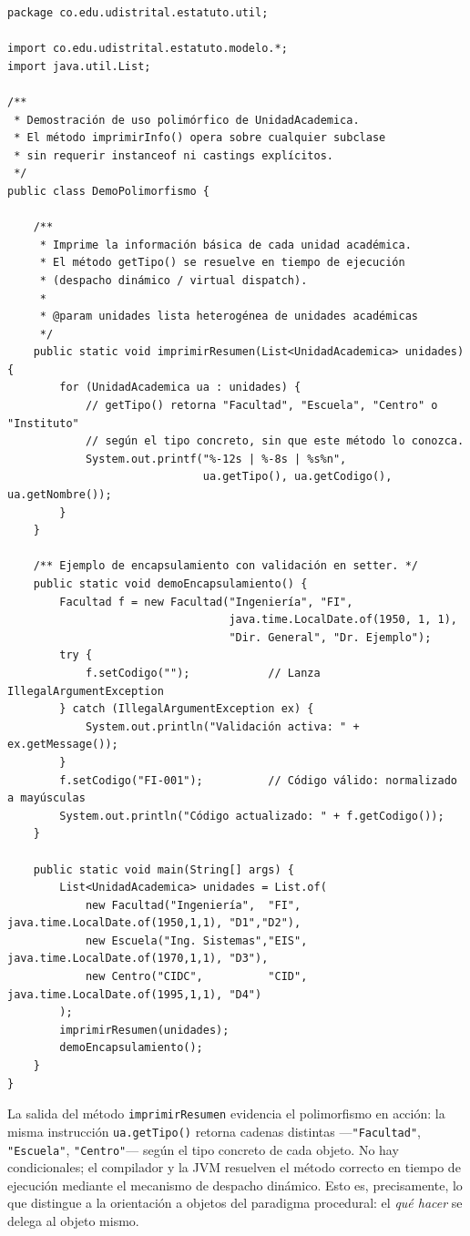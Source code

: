 \begin{lstlisting}[style=javaStyle, caption={Ejemplo de polimorfismo con \texttt{UnidadAcademica}}, label={lst:polimorfismo}]
package co.edu.udistrital.estatuto.util;

import co.edu.udistrital.estatuto.modelo.*;
import java.util.List;

/**
 * Demostración de uso polimórfico de UnidadAcademica.
 * El método imprimirInfo() opera sobre cualquier subclase
 * sin requerir instanceof ni castings explícitos.
 */
public class DemoPolimorfismo {

    /**
     * Imprime la información básica de cada unidad académica.
     * El método getTipo() se resuelve en tiempo de ejecución
     * (despacho dinámico / virtual dispatch).
     *
     * @param unidades lista heterogénea de unidades académicas
     */
    public static void imprimirResumen(List<UnidadAcademica> unidades) {
        for (UnidadAcademica ua : unidades) {
            // getTipo() retorna "Facultad", "Escuela", "Centro" o "Instituto"
            // según el tipo concreto, sin que este método lo conozca.
            System.out.printf("%-12s | %-8s | %s%n",
                              ua.getTipo(), ua.getCodigo(), ua.getNombre());
        }
    }

    /** Ejemplo de encapsulamiento con validación en setter. */
    public static void demoEncapsulamiento() {
        Facultad f = new Facultad("Ingeniería", "FI",
                                  java.time.LocalDate.of(1950, 1, 1),
                                  "Dir. General", "Dr. Ejemplo");
        try {
            f.setCodigo("");            // Lanza IllegalArgumentException
        } catch (IllegalArgumentException ex) {
            System.out.println("Validación activa: " + ex.getMessage());
        }
        f.setCodigo("FI-001");          // Código válido: normalizado a mayúsculas
        System.out.println("Código actualizado: " + f.getCodigo());
    }

    public static void main(String[] args) {
        List<UnidadAcademica> unidades = List.of(
            new Facultad("Ingeniería",  "FI",  java.time.LocalDate.of(1950,1,1), "D1","D2"),
            new Escuela("Ing. Sistemas","EIS", java.time.LocalDate.of(1970,1,1), "D3"),
            new Centro("CIDC",          "CID", java.time.LocalDate.of(1995,1,1), "D4")
        );
        imprimirResumen(unidades);
        demoEncapsulamiento();
    }
}
\end{lstlisting}

\noindent
La salida del método \texttt{imprimirResumen} evidencia el polimorfismo en acción:
la misma instrucción \texttt{ua.getTipo()} retorna cadenas distintas
---\texttt{"Facultad"}, \texttt{"Escuela"}, \texttt{"Centro"}--- según el tipo
concreto de cada objeto. No hay condicionales; el compilador y la JVM resuelven el
método correcto en tiempo de ejecución mediante el mecanismo de despacho dinámico.
Esto es, precisamente, lo que distingue a la orientación a objetos del paradigma
procedural: el \textit{qué hacer} se delega al objeto mismo.

